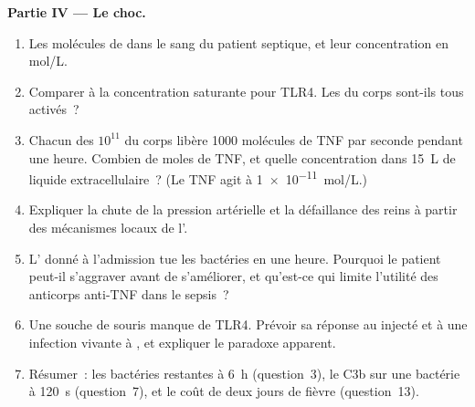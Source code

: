 \begin{problem}
\medskip
\noindent\textbf{Partie IV --- Le choc.}
\begin{enumerate}[resume]
  \item Les molécules de  dans le sang du patient
        septique, et leur concentration en mol/L.
  \item Comparer à la concentration saturante pour TLR4. Les 
        du corps sont-ils tous activés~?
  \item Chacun des $10^{11}$  du corps libère \num{1000}
        molécules de TNF par seconde pendant une heure. Combien de moles
        de TNF, et quelle concentration dans \qty{15}{L} de liquide
        extracellulaire~? (Le TNF agit à \qty{1e-11}{mol/L}.)
  \item Expliquer la chute de la pression artérielle et la défaillance
        des reins à partir des mécanismes locaux de l'.
  \item L' donné à l'admission tue les bactéries en une
        heure. Pourquoi le patient peut-il s'aggraver avant de
        s'améliorer, et qu'est-ce qui limite l'utilité des anticorps
        anti-TNF dans le sepsis~?
  \item Une souche de souris manque de TLR4. Prévoir sa réponse au
         injecté et à une infection vivante à , et expliquer le paradoxe apparent.
  \item Résumer~: les bactéries restantes à \qty{6}{h} (question~3), le
        C3b sur une bactérie à \qty{120}{s} (question~7), et le coût de
        deux jours de fièvre (question~13).
\end{enumerate}
\end{problem}
